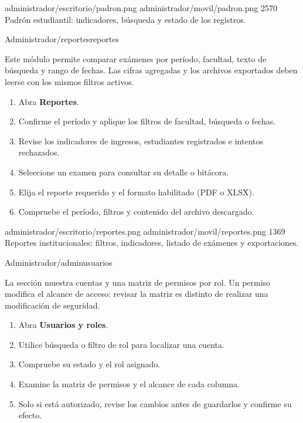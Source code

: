 \documentclass[11pt,a4paper]{article}
\begin{document}


\Pantallas
{administrador/escritorio/padron.png}
{administrador/movil/padron.png}
{2570}
{Padrón estudiantil: indicadores, búsqueda
y estado de los registros.}


{Administrador}{/reportes}{reportes}

Este módulo permite comparar exámenes por período,
facultad, texto de búsqueda y rango de fechas.
Las cifras agregadas y los archivos exportados
deben leerse con los mismos filtros activos.

\pasos
\begin{enumerate}
\item Abra \textbf{Reportes}.
\item Confirme el período y aplique los filtros de facultad,
búsqueda o fechas.
\item Revise los indicadores de ingresos, estudiantes
registrados e intentos rechazados.
\item Seleccione un examen para consultar su detalle
o bitácora.
\item Elija el reporte requerido y el formato habilitado
(PDF o XLSX).
\item Compruebe el período, filtros y contenido
del archivo descargado.
\end{enumerate}


\Pantallas
{administrador/escritorio/reportes.png}
{administrador/movil/reportes.png}
{1369}
{Reportes institucionales: filtros, indicadores,
listado de exámenes y exportaciones.}


{Administrador}{/admin}{usuarios}

La sección muestra cuentas y una matriz de permisos
por rol. Un permiso modifica el alcance de acceso:
revisar la matriz es distinto de realizar una
modificación de seguridad.

\pasos
\begin{enumerate}
\item Abra \textbf{Usuarios y roles}.
\item Utilice búsqueda o filtro de rol para localizar
una cuenta.
\item Compruebe su estado y el rol asignado.
\item Examine la matriz de permisos y el alcance
de cada columna.
\item Solo si está autorizado, revise los cambios
antes de guardarlos y confirme su efecto.
\end{enumerate}
\end{document}
